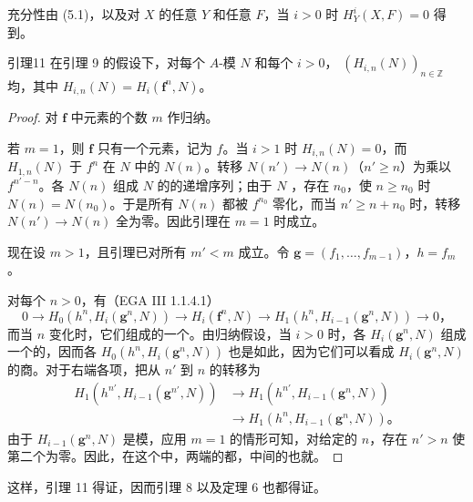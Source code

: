 充分性由 (5.1)，以及对 $X$ 的任意 $Y$ 和任意 $F$，当 $i>0$ 时 $H_Y^i(X,F)=0$ 得到。
\begin{SGAresult}{引理}{11}
在引理 9 的假设下，对每个 $A$-模 $N$ 和每个 $i>0$， $(H_{i,n}(N))_{n\in\mathbb Z}$ 均，其中 $H_{i,n}(N)=H_i(\mathbf f^n,N)$。
\end{SGAresult}
\begin{proof}
对 $\mathbf f$ 中元素的个数 $m$ 作归纳。

若 $m=1$，则 $\mathbf f$ 只有一个元素，记为 $f$。当 $i>1$ 时 $H_{i,n}(N)=0$，而 $H_{1,n}(N)$ 于 $f^n$ 在 $N$ 中的 $N(n)$。转移 $N(n')\to N(n)$（$n'\ge n$）为乘以 $f^{n'-n}$。各 $N(n)$ 组成 $N$ 的的递增序列；由于 $N$ ，存在 $n_0$，使 $n\ge n_0$ 时 $N(n)=N(n_0)$。于是所有 $N(n)$ 都被 $f^{n_0}$ 零化，而当 $n'\ge n+n_0$ 时，转移 $N(n')\to N(n)$ 全为零。因此引理在 $m=1$ 时成立。

现在设 $m>1$，且引理已对所有 $m'<m$ 成立。令 $\mathbf g=(f_1,\ldots,f_{m-1})$，$h=f_m$。

对每个 $n>0$，有（EGA III 1.1.4.1）
\[
0\longrightarrow H_0(h^n,H_i(\mathbf g^n,N))
\longrightarrow H_i(\mathbf f^n,N)
\longrightarrow H_1(h^n,H_{i-1}(\mathbf g^n,N))
\longrightarrow0，
\]
而当 $n$ 变化时，它们组成的一个。由归纳假设，当 $i>0$ 时，各 $H_i(\mathbf g^n,N)$ 组成一个的，因而各 $H_0(h^n,H_i(\mathbf g^n,N))$ 也是如此，因为它们可以看成 $H_i(\mathbf g^n,N)$ 的商。对于右端各项，把从 $n'$ 到 $n$ 的转移为
\[
\begin{aligned}
H_1(h^{n'},H_{i-1}(\mathbf g^{n'},N))
&\longrightarrow H_1(h^{n'},H_{i-1}(\mathbf g^n,N))\\
&\longrightarrow H_1(h^n,H_{i-1}(\mathbf g^n,N))。
\end{aligned}
\]
由于 $H_{i-1}(\mathbf g^n,N)$ 是模，应用 $m=1$ 的情形可知，对给定的 $n$，存在 $n'>n$ 使第二个为零。因此，在这个中，两端的都，中间的也就。
\end{proof}
这样，引理 11 得证，因而引理 8 以及定理 6 也都得证。

